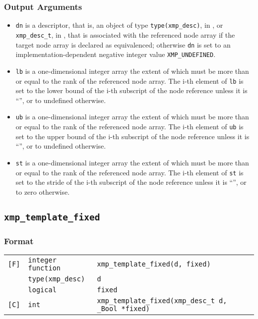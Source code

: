 \subsubsection*{Output Arguments}
\begin{itemize}
 \item {\tt dn} is a descriptor, that is, an object of type 
       {\tt type(xmp\_desc)}, in {\XMPF}, or {\tt xmp\_desc\_t},
       in {\XMPC}, that is associated with the referenced node array
       if the target node array is declared as equivalenced; otherwise
       {\tt dn} is set to an implementation-dependent negative integer
       value {\tt XMP\_UNDEFINED}.
 \item {\tt lb} is a one-dimensional integer array the extent of which
       must be more than or equal to the rank of the referenced node
       array. The i-th element of {\tt lb} is set to the lower bound of
       the i-th subscript of the node reference unless it is ``{\tt *}'',
       or to undefined otherwise.
 \item {\tt ub} is a one-dimensional integer array the extent of which
       must be more than or equal to the rank of the referenced node
       array. The i-th element of {\tt ub} is set to the upper bound of
       the i-th subscript of the node reference unless it is ``{\tt *}'',
       or to undefined otherwise.
 \item {\tt st} is a one-dimensional integer array the extent of which
       must be more than or equal to the rank of the referenced node
       array. The i-th element of {\tt st} is set to the stride of
       the i-th subscript of the node reference unless it is ``{\tt *}'',
       or to zero otherwise.
\end{itemize}


\subsection{\tt xmp\_template\_fixed}

\subsubsection*{Format}

\begin{tabular}{lll}

\verb![F]!& {\tt integer function}& {\tt xmp\_template\_fixed(d, fixed)}\\
          & {\tt type(xmp\_desc)} & {\tt d}\\
          & {\tt logical} & {\tt fixed}\\

\verb![C]!&  {\tt int}& {\tt xmp\_template\_fixed(xmp\_desc\_t d, \_Bool *fixed)}\\

\end{tabular}

